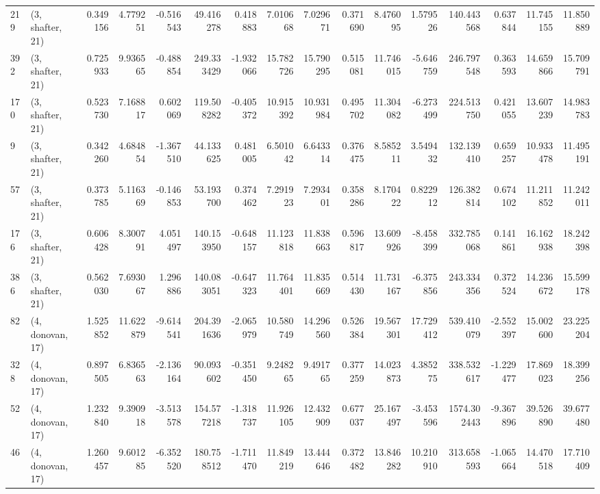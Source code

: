 \begin{tabular}{llrrrrrrrrrrrrrr}
219 &  (3, shafter, 21) &   0.349156 &   4.779251 &  -0.516543 &    49.416278 &   0.418883 &   7.010668 &   7.029671 &  0.371690 &   8.476095 &   1.579526 &   140.443568 &   0.637844 &  11.745155 &  11.850889 \\
392 &  (3, shafter, 21) &   0.725933 &   9.936565 &  -0.488854 &   249.333429 &  -1.932066 &  15.782726 &  15.790295 &  0.515081 &  11.746015 &  -5.646759 &   246.797548 &   0.363593 &  14.659866 &  15.709791 \\
170 &  (3, shafter, 21) &   0.523730 &   7.168817 &   0.602069 &   119.508282 &  -0.405372 &  10.915392 &  10.931984 &  0.495702 &  11.304082 &  -6.273499 &   224.513750 &   0.421055 &  13.607239 &  14.983783 \\
9   &  (3, shafter, 21) &   0.342260 &   4.684854 &  -1.367510 &    44.133625 &   0.481005 &   6.501042 &   6.643314 &  0.376475 &   8.585211 &   3.549432 &   132.139410 &   0.659257 &  10.933478 &  11.495191 \\
57  &  (3, shafter, 21) &   0.373785 &   5.116369 &  -0.146853 &    53.193700 &   0.374462 &   7.291923 &   7.293401 &  0.358286 &   8.170422 &   0.822912 &   126.382814 &   0.674102 &  11.211852 &  11.242011 \\
176 &  (3, shafter, 21) &   0.606428 &   8.300791 &   4.051497 &   140.153950 &  -0.648157 &  11.123818 &  11.838663 &  0.596817 &  13.609926 &  -8.458399 &   332.785068 &   0.141861 &  16.162938 &  18.242398 \\
386 &  (3, shafter, 21) &   0.562030 &   7.693067 &   1.296886 &   140.083051 &  -0.647323 &  11.764401 &  11.835669 &  0.514430 &  11.731167 &  -6.375856 &   243.334356 &   0.372524 &  14.236672 &  15.599178 \\
82  &  (4, donovan, 17) &   1.525852 &  11.622879 &  -9.614541 &   204.391636 &  -2.065979 &  10.580749 &  14.296560 &  0.526384 &  19.567301 &  17.729412 &   539.410079 &  -2.552397 &  15.002600 &  23.225204 \\
328 &  (4, donovan, 17) &   0.897505 &   6.836563 &  -2.136164 &    90.093602 &  -0.351450 &   9.248265 &   9.491765 &  0.377259 &  14.023873 &   4.385275 &   338.532617 &  -1.229477 &  17.869023 &  18.399256 \\
52  &  (4, donovan, 17) &   1.232840 &   9.390918 &  -3.513578 &   154.577218 &  -1.318737 &  11.926105 &  12.432909 &  0.677037 &  25.167497 &  -3.453596 &  1574.302443 &  -9.367896 &  39.526890 &  39.677480 \\
46  &  (4, donovan, 17) &   1.260457 &   9.601285 &  -6.352520 &   180.758512 &  -1.711470 &  11.849219 &  13.444646 &  0.372482 &  13.846282 &  10.210910 &   313.658593 &  -1.065664 &  14.470518 &  17.710409 \\

\end{tabular}
